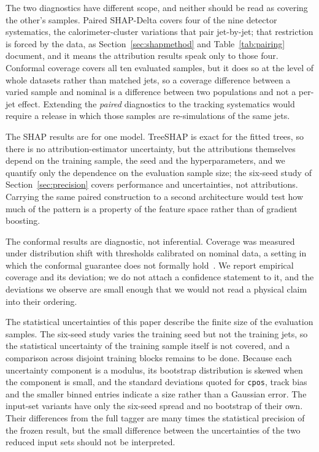 \documentclass[pdflatex,sn-mathphys,Numbered,iicol]{sn-jnl}
\begin{document}
The two diagnostics have different scope, and neither should be read as covering the
other's samples. Paired SHAP-Delta covers four of the nine detector systematics, the
calorimeter-cluster variations that pair jet-by-jet; that restriction is forced by the
data, as Section~\ref{sec:shapmethod} and Table~\ref{tab:pairing} document, and it means
the attribution results speak only to those four. Conformal coverage covers all ten
evaluated samples, but it does so at the level of whole datasets rather than matched
jets, so a coverage difference between a varied sample and nominal is a difference
between two populations and not a per-jet effect. Extending the \emph{paired}
diagnostics to the tracking systematics would require a release in which those samples
are re-simulations of the same jets.

The SHAP results are for one model. TreeSHAP is exact for the fitted trees, so there is
no attribution-estimator uncertainty, but the attributions themselves depend on the
training sample, the seed and the hyperparameters, and we quantify only the dependence
on the evaluation sample size; the six-seed study of Section~\ref{sec:precision} covers
performance and uncertainties, not attributions. Carrying the same paired construction to a second
architecture would test how much of the pattern is a property of the feature space
rather than of gradient boosting.

The conformal results are diagnostic, not inferential. Coverage was measured under
distribution shift with thresholds calibrated on nominal data, a setting in which the
conformal guarantee does not formally hold~\cite{Tibshirani2019}. We report empirical
coverage and its deviation; we do not attach a confidence statement to it, and the
deviations we observe are small enough that we would not read a physical claim into
their ordering.

The statistical uncertainties of this paper describe the finite size of the evaluation
samples. The six-seed study varies the training seed but not the training jets, so the
statistical uncertainty of the training sample itself is not covered, and a comparison
across disjoint training blocks remains to be done. Because each uncertainty component
is a modulus, its bootstrap distribution is skewed when the component is small, and the
standard deviations quoted for \texttt{cpos}, track bias and the smaller binned entries
indicate a size rather than a Gaussian error. The input-set variants have only the
six-seed spread and no bootstrap of their own. Their differences from the full tagger
are many times the statistical precision of the frozen result, but the small difference
between the uncertainties of the two reduced input sets should not be interpreted.
\end{document}
